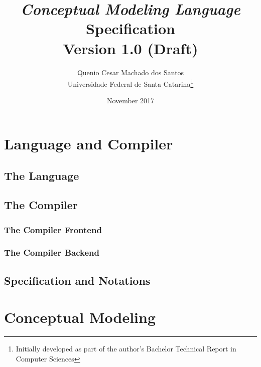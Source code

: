\documentclass[a4paper,oneside,12pt, extrafontsizes]{memoir}
\title{\emph{Conceptual Modeling Language}\\Specification\\ \small{Version 1.0 (Draft)}}
\author{Quenio Cesar Machado dos Santos\\
\small{Universidade Federal de Santa Catarina}\thanks{
Initially developed as part of the author's Bachelor Technical Report in Computer Sciences}}
\date{November 2017}
\begin{document}
\begin{titlingpage}
\maketitle
\end{titlingpage}

\frontmatter

\begin{KeepFromToc}

\clearpage
\tableofcontents

\clearpage
\listofcodes

\clearpage
\listoffigures

\clearpage
\listoftables

\end{KeepFromToc}

\mainmatter

\part{Language and Compiler}

\chapter{The Language}


\chapter{The Compiler}


\section[The Frontend]{The Compiler Frontend}
\label{sec:frontend}


\section[The Backend]{The Compiler Backend}
\label{sec:backend}


\chapter{Specification and Notations}
\label{ch:notations}


\part{Conceptual Modeling}
\end{document}
